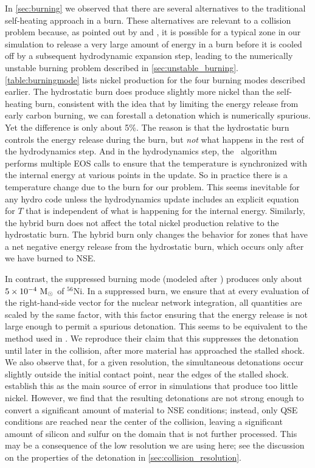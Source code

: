 \documentclass[12pt]{article}
\begin{document}
In \autoref{sec:burning} we observed that there are several alternatives to the traditional
self-heating approach in a burn. These alternatives are relevant to a collision problem because,
as pointed out by \cite{raskin:2010} and \cite{kushnir:2013}, it is possible for a typical
zone in our simulation to release a very large amount of energy in a burn before it is cooled
off by a subsequent hydrodynamic expansion step, leading to the numerically unstable burning
problem described in \autoref{sec:unstable_burning}. \autoref{table:burningmode} lists nickel
production for the four burning modes described earlier. The hydrostatic burn does produce
slightly more nickel than the self-heating burn, consistent with the idea that by limiting the
energy release from early carbon burning, we can forestall a detonation which is numerically
spurious. Yet the difference is only about 5\%. The reason is that the hydrostatic burn controls
the energy release during the burn, but \textit{not} what happens in the rest of the hydrodynamics
step. And in the hydrodynamics step, the \castro\ algorithm performs multiple EOS calls to ensure
that the temperature is synchronized with the internal energy at various points in the update.
So in practice there is a temperature change due to the burn for our problem. This seems inevitable
for any hydro code unless the hydrodynamics update includes an explicit equation for $T$ that is
independent of what is happening for the internal energy. Similarly, the hybrid burn does not
affect the total nickel production relative to the hydrostatic burn. The hybrid burn only changes
the behavior for zones that have a net negative energy release from the hydrostatic burn, which
occurs only after we have burned to NSE.



In contrast, the suppressed burning mode (modeled after \citealt{kushnir:2013}) produces only about
$5 \times 10^{-4}\ \mathrm{M}_\odot$ of $^{56}$Ni. In a suppressed burn, we ensure that at every evaluation
of the right-hand-side vector for the nuclear network integration, all quantities are scaled by the
same factor, with this factor ensuring that the energy release is not large enough to permit a
spurious detonation. This seems to be equivalent to the method used in \citet{kushnir:2013}. We
reproduce their claim that this suppresses the detonation until later in the collision, after more
material has approached the stalled shock. We also observe that, for a given resolution, the simultaneous
detonations occur slightly outside the initial contact point, near the edges of the stalled shock. \citeauthor{kushnir:2013}
establish this as the main source of error in simulations that produce too little nickel. However, we find
that the resulting detonations are not strong enough to convert a significant amount of material to NSE
conditions; instead, only QSE conditions are reached near the center of the collision, leaving a significant
amount of silicon and sulfur on the domain that is not further processed. This may be a consequence of
the low resolution we are using here; see the discussion on the properties of the detonation in
\autoref{sec:collision_resolution}.
\end{document}
